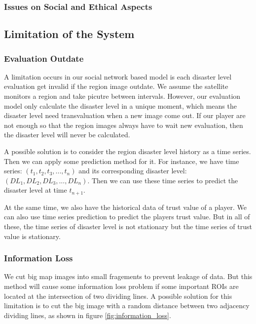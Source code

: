   \subsubsection{Issues on Social and Ethical Aspects}

\subsection{Limitation of the System}

  \subsubsection{Evaluation Outdate}

  A limitation occurs in our social network based model is each disaster level evaluation get invalid 
  if the region image outdate. 
  We assume the satellite monitors a region and take picutre between intervals. However, our evaluation
  model only calculate the disaster level in a unique moment, which means the disaster level need 
  transvaluation when a new image come out.
  If our player are not enough so that the region images always have to wait new evaluation, then the
  disaster level will never be calculated.

  A possible solution is to consider the region disaster level history as a time series. Then we can apply
  some prediction method for it. For instance, we have time series: $(t_1, t_2, t_3, ..., t_n)$
  and its corresponding disaster level: $(DL_1, DL_2, DL_3, ..., DL_n)$.
  Then we can use these time series to predict the disaster level at time $t_{n+1}$.

  At the same time, we also have the historical data of trust value of a player. We can also
  use time series prediction to predict the players trust value. But in all of these, the time series
  of disaster level is not stationary but the time series of trust value is stationary.

  \subsubsection{Information Loss}
  We cut big map images into small fragements to prevent leakage of data. 
  But this method will cause some information loss problem if some important ROIs are 
  located at the intersection of two dividing lines.
  A possible solution for this limitation is to cut the big image with a random distance 
  between two adjacency dividing lines, as shown in figure \ref{fig:information_loss}.

